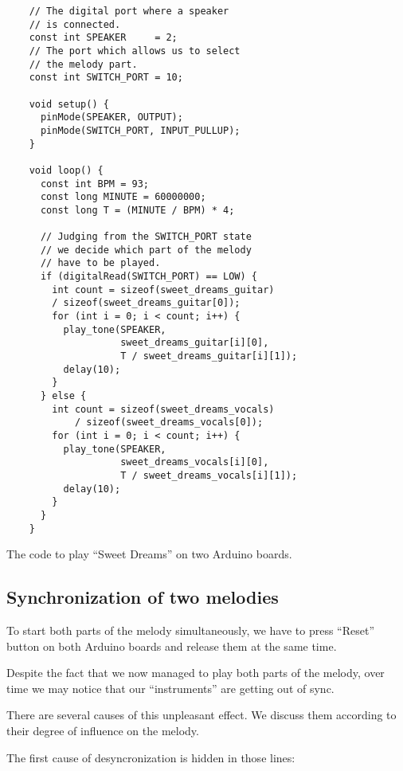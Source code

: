 \documentclass[../sparc.tex]{subfiles}
\begin{document}
\begin{listing}[!h]
  \begin{verbatim}
    // The digital port where a speaker
    // is connected.
    const int SPEAKER     = 2;
    // The port which allows us to select
    // the melody part.
    const int SWITCH_PORT = 10;

    void setup() {
      pinMode(SPEAKER, OUTPUT);
      pinMode(SWITCH_PORT, INPUT_PULLUP);
    }

    void loop() {
      const int BPM = 93;
      const long MINUTE = 60000000;
      const long T = (MINUTE / BPM) * 4;

      // Judging from the SWITCH_PORT state
      // we decide which part of the melody
      // have to be played.
      if (digitalRead(SWITCH_PORT) == LOW) {
        int count = sizeof(sweet_dreams_guitar)
        / sizeof(sweet_dreams_guitar[0]);
        for (int i = 0; i < count; i++) {
          play_tone(SPEAKER,
                    sweet_dreams_guitar[i][0],
                    T / sweet_dreams_guitar[i][1]);
          delay(10);
        }
      } else {
        int count = sizeof(sweet_dreams_vocals)
            / sizeof(sweet_dreams_vocals[0]);
        for (int i = 0; i < count; i++) {
          play_tone(SPEAKER,
                    sweet_dreams_vocals[i][0],
                    T / sweet_dreams_vocals[i][1]);
          delay(10);
        }
      }
    }
  \end{verbatim}
  \caption{The code to play ``Sweet Dreams'' on two Arduino boards.}
  \label{listing:music-band-sweet-dreams-3}
\end{listing}

\newpage
\subsection{Synchronization of two melodies}

To start both parts of the melody simultaneously, we have to press ``Reset''
button on both Arduino boards and release them at the same time.

Despite the fact that we now managed to play both parts of the melody, over time
we may notice that our ``instruments'' are getting out of sync.

There are several causes of this unpleasant effect.  We discuss them according
to their degree of influence on the melody.

The first cause of desyncronization is hidden in those lines:
\end{document}
